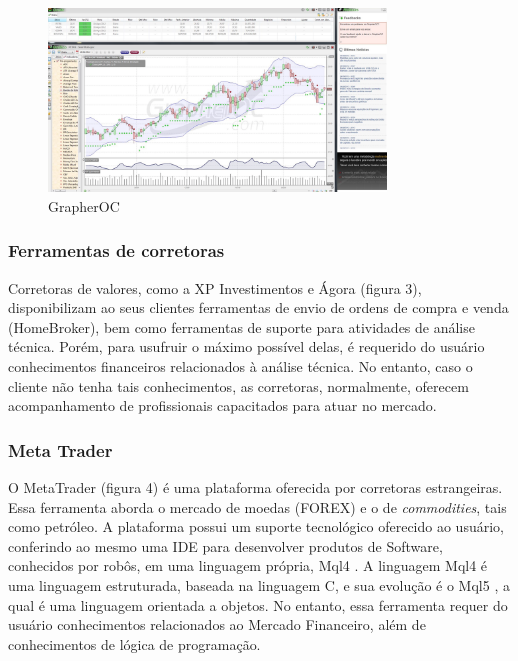 \begin{figure}[h]
\centering
\label{f03}
\includegraphics[width=0.8\textwidth]{figuras/f03}
\caption{GrapherOC}

\end{figure}

\subsubsection{Ferramentas de corretoras}

Corretoras de valores, como a XP Investimentos e Ágora (figura 3), disponibilizam ao seus clientes ferramentas de envio de ordens de compra e venda (HomeBroker), bem como ferramentas de suporte para atividades de análise técnica. Porém, para usufruir o máximo possível delas, é requerido do usuário conhecimentos financeiros relacionados à análise técnica. No entanto, caso o cliente não tenha tais conhecimentos, as corretoras, normalmente, oferecem acompanhamento de profissionais capacitados para atuar no mercado.

\subsubsection{Meta Trader}

O MetaTrader (figura 4) é uma plataforma oferecida por corretoras estrangeiras. Essa ferramenta aborda o mercado de moedas (FOREX) e o de \textit{commodities}, tais como petróleo. A plataforma possui um suporte tecnológico oferecido ao usuário, conferindo ao mesmo uma IDE para desenvolver produtos de Software, conhecidos por robôs, em uma linguagem própria, Mql4 \cite{kovalyov2006}. A linguagem Mql4 é uma linguagem estruturada, baseada na linguagem C, e sua evolução é o Mql5 \cite{metaquotes2014}, a qual é uma linguagem orientada a objetos. No entanto, essa ferramenta requer do usuário conhecimentos relacionados ao Mercado Financeiro, além de conhecimentos de lógica de programação.

